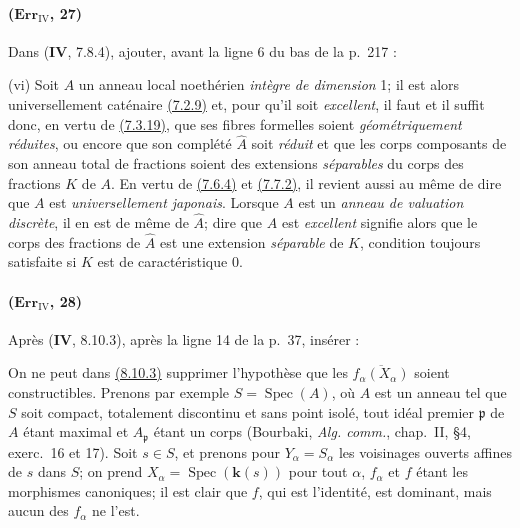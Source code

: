 \paragraph{($\mathbf{Err}_{\mathrm{IV}}$, 27)}
Dans (\textbf{IV}, 7.8.4), ajouter, avant la ligne 6 du bas de la p.~217 :

\smallskip
\noindent
\textup{(vi)} Soit $A$ un anneau local noethérien \emph{intègre de dimension}
1; il est alors universellement caténaire
{\hyperref[canon-index.ega4.c04.cor.7-2-9]{(7.2.9)}} et, pour qu'il soit \emph{excellent},
il faut et il suffit donc, en vertu de
{\hyperref[canon-index.ega4.c04.statement.7-3-19]{(7.3.19)}}, que ses fibres
formelles soient \emph{géométriquement réduites}, ou encore que son complété
$\widehat A$ soit \emph{réduit} et que les corps composants de son anneau total
de fractions soient des extensions \emph{séparables} du corps des fractions
$K$ de $A$. En vertu de {\hyperref[canon-index.ega4.c04.thm.7-6-4]{(7.6.4)}} et
{\hyperref[canon-index.ega4.c04.thm.7-7-2]{(7.7.2)}}, il revient aussi au même de
dire que $A$ est \emph{universellement japonais}. Lorsque $A$ est un \emph{anneau de
valuation discrète}, il en est de même de $\widehat A$; dire que $A$ est
\emph{excellent} signifie alors que le corps des fractions de $\widehat A$
est une extension \emph{séparable} de $K$, condition toujours satisfaite si
$K$ est de caractéristique 0.

\paragraph{($\mathbf{Err}_{\mathrm{IV}}$, 28)}
Après (\textbf{IV}, 8.10.3), après la ligne 14 de la p.~37, insérer :

\begin{remark}[8.10.3.1]
\label{IV.8.10.3.1}
On ne peut dans {\hyperref[canon-index.ega4.c04.prop.8-10-3]{(8.10.3)}} supprimer
l'hypothèse que les $\overline{f_\alpha(X_\alpha)}$ soient
constructibles. Prenons par exemple $S=\operatorname{Spec}(A)$, où $A$
est un anneau tel que $S$ soit compact, totalement discontinu et sans
point isolé, tout idéal premier $\mathfrak p$ de $A$ étant maximal et
$A_\mathfrak p$ étant un corps (Bourbaki, \emph{Alg. comm.}, chap.~II,
\S4, exerc.~16 et 17). Soit $s\in S$, et prenons pour
$Y_\alpha=S_\alpha$ les voisinages ouverts affines de $s$ dans $S$; on
prend $X_\alpha=\operatorname{Spec}(\boldsymbol{k}(s))$ pour tout $\alpha$,
$f_\alpha$ et $f$ étant les morphismes canoniques; il est clair que
$f$, qui est l'identité, est dominant, mais aucun des $f_\alpha$ ne
l'est.
\end{remark}

